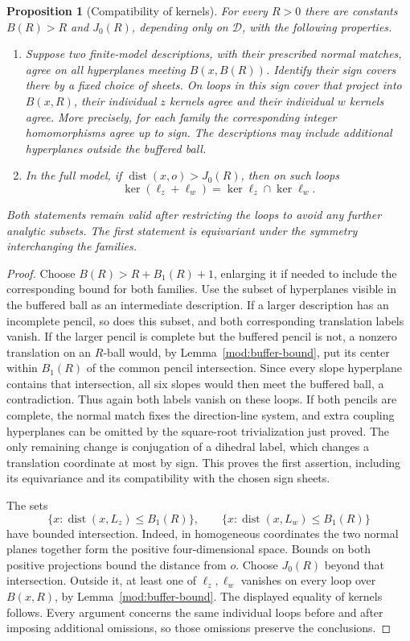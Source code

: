 \documentclass[11pt,reqno]{amsart}
\numberwithin{equation}{section}
\newtheorem{proposition}[theorem]{Proposition}
\theoremstyle{definition}
\theoremstyle{remark}
\begin{document}
\begin{proposition}[Compatibility of kernels]\label{prop:kernel-compatibility}
For every $R>0$ there are constants $B(R)>R$ and $J_0(R)$, depending
only on $\mathcal D$, with the following properties.
\begin{enumerate}
\item Suppose two finite-model descriptions, with their prescribed
normal matches, agree on all hyperplanes meeting $B(x,B(R))$.
Identify their sign covers there by a fixed choice of sheets.
On loops in this sign cover that project into $B(x,R)$, their
individual $z$ kernels agree and their individual $w$ kernels
agree.  More precisely, for each family the corresponding integer
homomorphisms agree up to sign.
The descriptions may include additional hyperplanes outside the
buffered ball.
\item In the full model, if $\operatorname{dist}(x,o)>J_0(R)$, then on such loops
\[
 \ker(\ell_z+\ell_w)=\ker\ell_z\cap\ker\ell_w.
\]
\end{enumerate}
Both statements remain valid after restricting the loops to avoid
any further analytic subsets.  The first statement is equivariant
under the symmetry interchanging the families.
\end{proposition}
\begin{proof}
Choose $B(R)>R+B_1(R)+1$, enlarging it if needed to include the
corresponding bound for both families.  Use the subset of hyperplanes
visible in the buffered ball as an intermediate description.
If a larger description has an incomplete pencil, so does this
subset, and both corresponding translation labels vanish.
If the larger pencil is complete but the buffered pencil is not,
a nonzero translation on an $R$-ball would, by
Lemma~\ref{mod:buffer-bound}, put its center within $B_1(R)$ of the
common pencil intersection.  Since every slope hyperplane contains
that intersection, all six slopes would then meet the buffered
ball, a contradiction.  Thus again both labels vanish on these
loops.  If both pencils are complete, the normal match fixes the
direction-line system, and extra coupling hyperplanes can be
omitted by the square-root trivialization just proved.  The only
remaining change is conjugation of a dihedral label, which changes
a translation coordinate at most by sign.  This proves the first
assertion, including its equivariance and its compatibility with
the chosen sign sheets.

The sets
\[
 \{x:\operatorname{dist}(x,L_z)\le B_1(R)\},\qquad
 \{x:\operatorname{dist}(x,L_w)\le B_1(R)\}
\]
have bounded intersection.  Indeed, in homogeneous coordinates
the two normal planes together form the positive four-dimensional
space.  Bounds on both positive projections bound the distance
from $o$.  Choose $J_0(R)$ beyond that intersection.  Outside it,
at least one of $\ell_z,\ell_w$ vanishes on every loop over
$B(x,R)$, by Lemma~\ref{mod:buffer-bound}.  The displayed equality
of kernels follows.  Every argument concerns the same individual
loops before and after imposing additional omissions, so those
omissions preserve the conclusions.
\end{proof}
\end{document}
